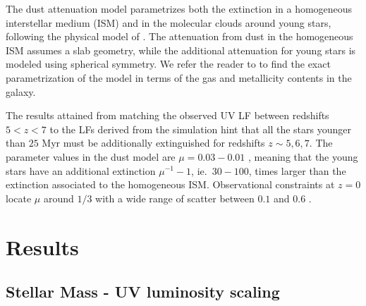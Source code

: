 \documentclass{emulateapj}
\begin{document}
The dust attenuation model parametrizes both the extinction in a
homogeneous interstellar medium (ISM) and in the molecular clouds around
young stars, following the physical model of \cite{2000ApJ...539..718C}.
The attenuation from dust in the homogeneous ISM assumes
a slab geometry, while the additional attenuation
for young stars is modeled using spherical symmetry. We refer the
reader to \cite{2010MNRAS.403L..31F} to find the exact
parametrization of the model in terms of the gas and metallicity
contents in the galaxy.

The results attained from matching the observed UV LF between redshifts
$5<z<7$ to the LFs derived from the simulation hint that all the stars younger
than $25$ Myr must be additionally extinguished for redshifts $z\sim
5,6,7$. The parameter values in the dust model are $\mu=0.03-0.01$
\citep{2010MNRAS.403L..31F}, meaning that the young stars have an
additional extinction $\mu^{-1} - 1$, ie.~$30-100$, times larger than
the extinction associated to the homogeneous ISM. Observational
constraints at $z=0$ locate $\mu$ around $1/3$ with a wide range of
scatter between $0.1$ and $0.6$ \citep{2004MNRAS.349..769K}.   

\section{Results}
\label{sec:results}

\subsection{Stellar Mass - UV luminosity scaling}
\end{document}
